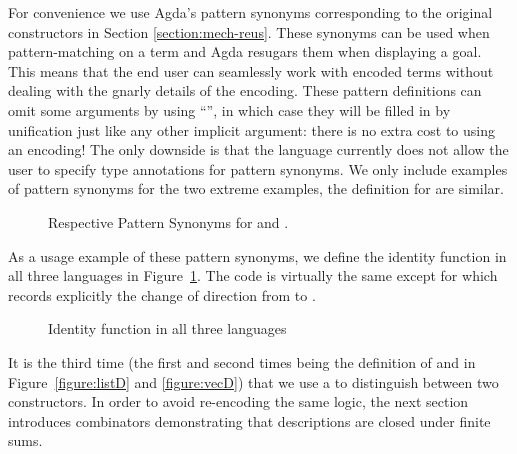 For convenience we use Agda's pattern synonyms corresponding to the
original constructors in Section \ref{section:mech-reus}. These
synonyms can be used when pattern-matching on a term and Agda resugars
them when displaying a goal. This means that the end user can
seamlessly work with encoded terms without dealing with the gnarly
details of the encoding.  These pattern definitions can omit some
arguments by using ``\AS{\_}'', in which case they will be filled in
by unification just like any other implicit argument: there is no
extra cost to using an encoding!  The only downside is that the
language currently does not allow the user to specify type annotations
for pattern synonyms. We only include examples of pattern synonyms
for the two extreme examples, the definition for  are similar.

\begin{figure}[h]
\begin{minipage}{0.40\textwidth}
\end{minipage}\hspace{2em}
\begin{minipage}{0.50\textwidth}
\end{minipage}
\caption{Respective Pattern Synonyms for  and .}
\end{figure}

As a usage example of these pattern synonyms, we define the identity
function in all three languages in Figure~\ref{fig:identity}. The code
is virtually the same except for  which records explicitly
the change of direction from  to .

\begin{figure}[h]
\begin{minipage}{0.28\textwidth}
\end{minipage}\hfill
\begin{minipage}{0.30\textwidth}
\end{minipage}\hfill
\begin{minipage}{0.32\textwidth}
\end{minipage}
\caption{Identity function in all three languages}\label{fig:identity}
\end{figure}

It is the third time (the first and second times being the definition of
 and  in Figure~\ref{figure:listD} and \ref{figure:vecD})
that we use a  to distinguish between two constructors. In order
to avoid re-encoding the same logic,
the next section introduces combinators demonstrating that
descriptions are closed under finite sums.

